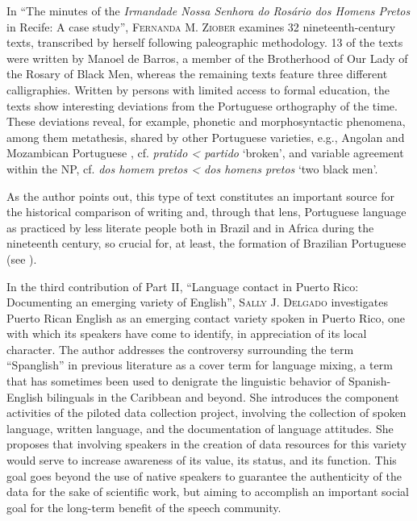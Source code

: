 \documentclass[output=paper,colorlinks,citecolor=brown]{langscibook}
\begin{document}
In ``The minutes of the \emph{Irmandade Nossa Senhora do Rosário dos Homens Pretos} in Recife: A case study'', \textsc{Fernanda M. Ziober} examines 32 nineteenth-century texts, transcribed by herself following paleographic methodology. 13 of the texts were written by Manoel de Barros, a member of the Brotherhood of Our Lady of the Rosary of Black Men, whereas the remaining texts feature three different calligraphies. Written by persons with limited access to formal education, the texts show interesting deviations from the Portuguese orthography of the time. These deviations reveal, for example, phonetic and morphosyntactic phenomena, among them metathesis, shared by other Portuguese varieties, e.g., Angolan and Mozambican Portuguese \citep{Petter_2009}, cf. \emph{pratido < partido} `broken', and variable agreement within the NP, cf. \emph{dos homem pretos < dos homens pretos} `two black men'.

As the author points out, this type of text constitutes an important source for the historical comparison of writing and, through that lens, Portuguese language as practiced by less literate people both in Brazil and in Africa during the nineteenth century, so crucial for, at least, the formation of Brazilian Portuguese (see \cite{Noll_1999}).

In the third contribution of Part II, “Language contact in Puerto Rico: Documenting an emerging variety of English”, \textsc{Sally J. Delgado} investigates Puerto Rican English as an emerging contact variety spoken in Puerto Rico, one with which its speakers have come to identify, in appreciation of its local character. The author addresses the controversy surrounding the term ``Spanglish'' in previous literature as a cover term for language mixing, a term that has sometimes been used to denigrate the linguistic behavior of Spanish-English bilinguals in the Caribbean and beyond. She introduces the component activities of the piloted data collection project, involving the collection of spoken language, written language, and the documentation of language attitudes. She proposes that involving speakers in the creation of data resources for this variety would serve to increase awareness of its value, its status, and its function. This goal goes beyond the use of native speakers to guarantee the authenticity of the data for the sake of scientific work, but aiming to accomplish an important social goal for the long-term benefit of the speech community.
\end{document}

